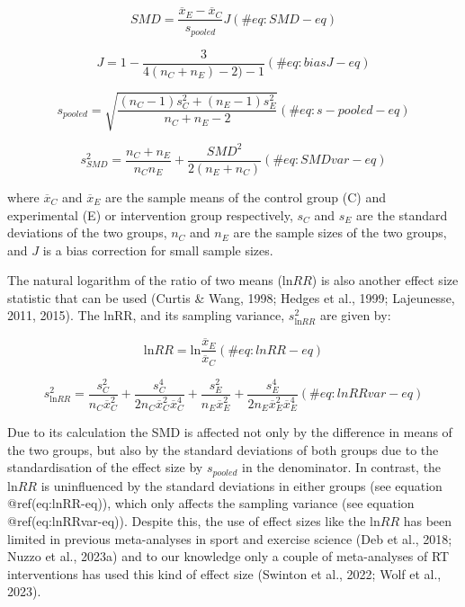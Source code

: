 \documentclass[
]{article}
\begin{document}
\begin{equation}
SMD=\frac{\overline{x}_E - \overline{x}_C}{s_{pooled}}J
(\#eq:SMD-eq)
\end{equation}

\begin{equation}
J=1-\frac{3}{4(n_{C}+n_{E})-2)-1}
(\#eq:biasJ-eq)
\end{equation}

\begin{equation}
s_{pooled}=\sqrt{\frac{(n_{C}-1)s^2_{C}+(n_{E}-1)s^2_{E}}{n_{C}+n_{E}-2}}
(\#eq:s-pooled-eq)
\end{equation}

\begin{equation}
s^2_{SMD}=\frac{n_{C}+n_{E}}{n_{C}n_{E}}+\frac{SMD^2}{2(n_{E}+n_{C})}
(\#eq:SMDvar-eq)
\end{equation}

where \(\overline{x}_C\) and \(\overline{x}_E\) are the sample means of the control group (C) and experimental (E) or intervention group respectively, \(s_C\) and \(s_E\) are the standard deviations of the two groups, \(n_C\) and \(n_E\) are the sample sizes of the two groups, and \(J\) is a bias correction for small sample sizes.

The natural logarithm of the ratio of two means (\(\textrm{ln}RR\)) is also another effect size statistic that can be used (Curtis \& Wang, 1998; Hedges et al., 1999; Lajeunesse, 2011, 2015). The lnRR, and its sampling variance, \(s^2_{\textrm{ln}RR}\) are given by:

\begin{equation}
\textrm{ln}RR=\textrm{ln}\frac{\overline{x}_E}{\overline{x}_C}
(\#eq:lnRR-eq)
\end{equation}

\begin{equation}
s^2_{\textrm{ln}RR}=\frac{s^2_{C}}{n_{C}\overline{x}^2_{C}}+\frac{s^4_{C}}{2n_{C}\overline{x}^2_{C}\overline{x}^4_{C}}+\frac{s^2_{E}}{n_{E}\overline{x}^2_{E}}+\frac{s^4_{E}}{2n_{E}\overline{x}^2_{E}\overline{x}^4_{E}}
(\#eq:lnRRvar-eq)
\end{equation}

Due to its calculation the SMD is affected not only by the difference in means of the two groups, but also by the standard deviations of both groups due to the standardisation of the effect size by \(s_{pooled}\) in the denominator. In contrast, the \(\textrm{ln}RR\) is uninfluenced by the standard deviations in either groups (see equation @ref(eq:lnRR-eq)), which only affects the sampling variance (see equation @ref(eq:lnRRvar-eq)). Despite this, the use of effect sizes like the \(\textrm{ln}RR\) has been limited in previous meta-analyses in sport and exercise science (Deb et al., 2018; Nuzzo et al., 2023a) and to our knowledge only a couple of meta-analyses of RT interventions has used this kind of effect size (Swinton et al., 2022; Wolf et al., 2023).
\end{document}
